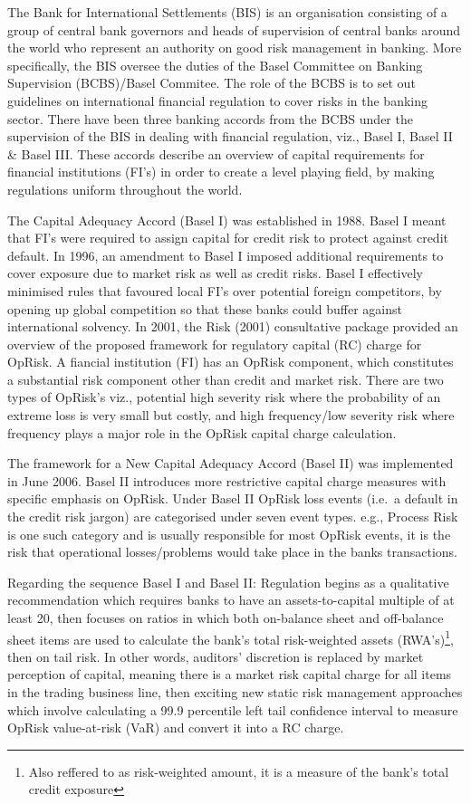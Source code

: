 \documentclass[]{DissertateUSU}
\let\rmarkdownfootnote\footnote%
\def\footnote{\protect\rmarkdownfootnote}
\begin{document}
The Bank for International Settlements (BIS) is an organisation
consisting of a group of central bank governors and heads of supervision
of central banks around the world who represent an authority on good
risk management in banking. More specifically, the BIS oversee the
duties of the Basel Committee on Banking Supervision (BCBS)/Basel
Commitee. The role of the BCBS is to set out guidelines on international
financial regulation to cover risks in the banking sector. There have
been three banking accords from the BCBS under the supervision of the
BIS in dealing with financial regulation, viz., Basel I, Basel II \&
Basel III. These accords describe an overview of capital requirements
for financial institutions (FI's) in order to create a level playing
field, by making regulations uniform throughout the world.\medskip 

The Capital Adequacy Accord (Basel I) was established in 1988. Basel I
meant that FI's were required to assign capital for credit risk to
protect against credit default. In 1996, an amendment to Basel I imposed
additional requirements to cover exposure due to market risk as well as
credit risks. Basel I effectively minimised rules that favoured local
FI's over potential foreign competitors, by opening up global
competition so that these banks could buffer against international
solvency. In 2001, the Risk (2001) consultative package provided an
overview of the proposed framework for regulatory capital (RC) charge
for OpRisk. A fiancial institution (FI) has an OpRisk component, which
constitutes a substantial risk component other than credit and market
risk. There are two types of OpRisk's viz., potential high severity risk
where the probability of an extreme loss is very small but costly, and
high frequency/low severity risk where frequency plays a major role in
the OpRisk capital charge calculation.\medskip 

The framework for a New Capital Adequacy Accord (Basel II) was
implemented in June 2006. Basel II introduces more restrictive capital
charge measures with specific emphasis on OpRisk. Under Basel II OpRisk
loss events (i.e.~a default in the credit risk jargon) are categorised
under seven event types. e.g., Process Risk is one such category and is
usually responsible for most OpRisk events, it is the risk that
operational losses/problems would take place in the banks
transactions.\medskip

Regarding the sequence Basel I and Basel II: Regulation begins as a
qualitative recommendation which requires banks to have an
assets-to-capital multiple of at least 20, then focuses on ratios in
which both on-balance sheet and off-balance sheet items are used to
calculate the bank's total risk-weighted assets
(RWA's)\footnote{Also reffered to as risk-weighted amount, it is a measure of the bank's total credit exposure},
then on tail risk. In other words, auditors' discretion is replaced by
market perception of capital, meaning there is a market risk capital
charge for all items in the trading business line, then exciting new
static risk management approaches which involve calculating a 99.9
percentile left tail confidence interval to measure OpRisk value-at-risk
(VaR) and convert it into a RC charge.\medskip 
\end{document}
